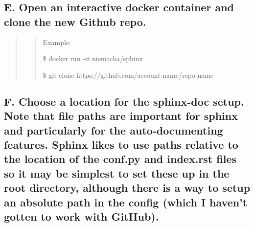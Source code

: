 \documentclass[letterpaper,10pt,english]{sphinxmanual}
\begin{document}
\subsection{E. Open an interactive docker container and clone the new Github repo.}
\label{docs/Process:e-open-an-interactive-docker-container-and-clone-the-new-github-repo}\begin{quote}
\begin{quote}

Example:

\$ docker run -it niemacka/sphinx

\$ git clone https://github.com/account-name/repo-name
\end{quote}
\end{quote}


\subsection{F. Choose a location for the sphinx-doc setup. Note that file paths are important for sphinx and particularly for the auto-documenting features. Sphinx likes to use paths relative to the location of the conf.py and index.rst files so it may be simplest to set these up in the root directory, although there is a way to setup an absolute path in the config (which I haven’t gotten to work with GitHub).}
\label{docs/Process:f-choose-a-location-for-the-sphinx-doc-setup-note-that-file-paths-are-important-for-sphinx-and-particularly-for-the-auto-documenting-features-sphinx-likes-to-use-paths-relative-to-the-location-of-the-conf-py-and-index-rst-files-so-it-may-be-simplest-to-set-these-up-in-the-root-directory-although-there-is-a-way-to-setup-an-absolute-path-in-the-config-which-i-havent-gotten-to-work-with-github}
\end{document}
